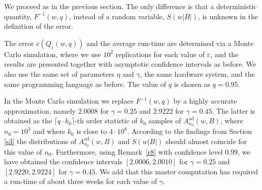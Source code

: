 \documentclass[a4paper]{amsart}
\theoremstyle{definition}
\theoremstyle{plain}
\newcommand{\adap}{\ensuremath{ \mathrm{ad} }}
\begin{document}
We proceed as in the previous section. The only difference is that
a deterministic quantity, $F^{-1}(w,q)$, instead of a random
variable, $S(w|B|)$, is unknown in the definition of the error.

The error $e(Q_\varepsilon(w,q))$ and the
average run-time are determined via a Monte Carlo simulation, where
we use $10^2$ replications for each value of
$\varepsilon$, and the
results are presented together with asymptotic confidence intervals
as before. We also use the same set of parameters $\eta$
and $\gamma$, the same hardware system, and the same programming
language as before. The value of $q$ is chosen as $q = 0.95$.

In the Monte Carlo simulation we replace $F^{-1}(w,q)$ by a
highly accurate approximation,
namely $2.0008$ for $\gamma=0.25$ and $2.9222$ for $\gamma=0.45$.
The latter is obtained as
the $\lceil q\cdot k_0\rceil$-th order statistic
of $k_0$ samples of $A^\adap_{n_0}(w,B)$, where
$n_0=10^3$ and where $k_0$ is close to $4\cdot 10^8$.
According to the findings from Section \ref{s3}
the distributions of $A^\adap_{n_0}(w,B)$ and $S(w |B|)$ should almost
coincide for this value of $n_0$. Furthermore, using
Remark~\ref{r8} with confidence level $0.99$,
we have obtained the confidence intervals
$[2.0006, 2.0010]$ for $\gamma=0.25$
and $[2.9220,2.9224]$ for $\gamma=0.45$.
We add that this master computation has required a run-time of
about three weeks for each value of $\gamma$.

%
%
%
\end{document}
